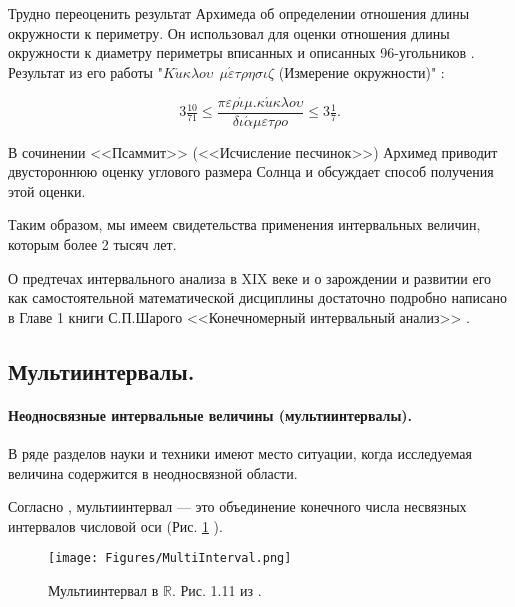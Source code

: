 \documentclass[a5paper,openany]{book}
\begin{document}
Трудно переоценить результат Архимеда об определении отношения длины окружности к периметру. Он использовал для оценки отношения длины окружности к диаметру периметры вписанных и описанных 96-угольников \cite{Archimedes}. Результат из его работы "$K \acute{u} \kappa \lambda o \upsilon \ \  \mu \acute{\varepsilon} \tau \rho \eta \sigma \iota \zeta$ (Измерение окружности)" : 

\begin{equation*}
3\tfrac{10}{71} \leq 
\dfrac{\pi \varepsilon \rho \acute{\iota} \mu. \kappa \acute{u} \kappa \lambda o \upsilon}{\delta \iota \acute{\alpha} \mu \varepsilon \tau \rho o} 
\leq 3\tfrac{1}{7}.
\end{equation*}

В сочинении <<Псаммит>> (<<Исчисление песчинок>>) Архимед приводит двустороннюю оценку углового размера Солнца и обсуждает способ получения этой оценки.

Таким образом, мы имеем свидетельства применения интервальных величин, которым более 2 тысяч лет.

О предтечах интервального анализа в XIX веке и о зарождении и развитии его как самостоятельной математической дисциплины достаточно подробно написано в Главе 1 книги С.П.Шарого <<Конечномерный интервальный анализ>> \cite{SharyBook}.

\subsection{Мультиинтервалы.}\label{s:MultiIntervals}

\paragraph{Неодносвязные интервальные величины (мультиинтервалы).}

В ряде разделов науки и техники имеют место ситуации, когда исследуемая величина  содержится в неодносвязной области. %

Согласно \cite{SharyBook}, мультиинтервал --- это объединение конечного числа несвязных интервалов числовой оси (Рис. \ref{f:MultiInterval} ). 

\begin{figure}[ht]
	\centering
	\texttt{[image: Figures/MultiInterval.png]}
	\caption{Мультиинтервал в $\mathbb{R}$. Рис. 1.11 из \cite{SharyBook}.}
	\label{f:MultiInterval} 
\end{figure}
\end{document}
